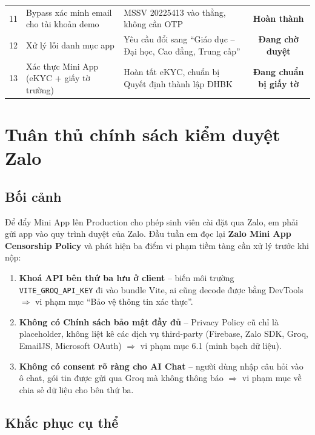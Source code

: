 \documentclass{article}
\begin{document}
\begin{center}
\begin{tabularx}{\textwidth}{@{}c l X c@{}}
11 & Bypass xác minh email cho tài khoản demo & MSSV 20225413 vào thẳng, không cần OTP & \textcolor{statusgreen}{\textbf{Hoàn thành}} \\
12 & Xử lý lỗi danh mục app & Yêu cầu đổi sang ``Giáo dục -- Đại học, Cao đẳng, Trung cấp'' & \textcolor{statusamber}{\textbf{Đang chờ duyệt}} \\
13 & Xác thực Mini App (eKYC + giấy tờ trường) & Hoàn tất eKYC, chuẩn bị Quyết định thành lập ĐHBK & \textcolor{statusamber}{\textbf{Đang chuẩn bị giấy tờ}} \\
\bottomrule
\end{tabularx}
\end{center}

\section{Tuân thủ chính sách kiểm duyệt Zalo}

\subsection{Bối cảnh}

Để đẩy Mini App lên Production cho phép sinh viên cài đặt qua Zalo, em phải gửi app vào quy trình duyệt của Zalo. Đầu tuần em đọc lại \textbf{Zalo Mini App Censorship Policy} và phát hiện ba điểm vi phạm tiềm tàng cần xử lý trước khi nộp:

\begin{enumerate}[leftmargin=1.5em]
  \item \textbf{Khoá API bên thứ ba lưu ở client} -- biến môi trường \texttt{VITE\_GROQ\_API\_KEY} đi vào bundle Vite, ai cũng decode được bằng DevTools $\Rightarrow$ vi phạm mục ``Bảo vệ thông tin xác thực''.
  \item \textbf{Không có Chính sách bảo mật đầy đủ} -- Privacy Policy cũ chỉ là placeholder, không liệt kê các dịch vụ third-party (Firebase, Zalo SDK, Groq, EmailJS, Microsoft OAuth) $\Rightarrow$ vi phạm mục 6.1 (minh bạch dữ liệu).
  \item \textbf{Không có consent rõ ràng cho AI Chat} -- người dùng nhập câu hỏi vào ô chat, gói tin được gửi qua Groq mà không thông báo $\Rightarrow$ vi phạm mục về chia sẻ dữ liệu cho bên thứ ba.
\end{enumerate}

\subsection{Khắc phục cụ thể}
\end{document}
